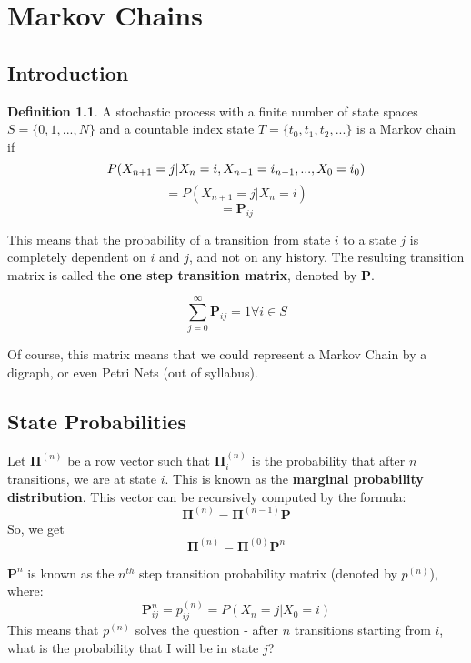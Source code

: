 \documentclass[12pt,letterpaper]{amsbook}
\theoremstyle{definition}
\newtheorem{definition}{Definition}%
\begin{document}
\chapter{Markov Chains}

\section{Introduction}

\begin{definition}
  A stochastic process with a finite number of state spaces $S = \{0,1,...,N\}$ and a countable index state $T = \{t_0,t_1,t_2,...\}$ is a Markov chain if
  \[P(X_{n+1} = j|X_n = i, X_{n-1} = i_{n-1},...,X_0 = i_0) \\ \]
  \[= P(X_{n+1} = j | X_n = i) \]
  \[= \mathbf{P}_{ij}\]
\end{definition}

This means that the probability of a transition from state $i$ to a state $j$ is completely dependent on $i$ and $j$, and not on any history. The resulting transition matrix is called the \textbf{one step transition matrix}, denoted by $\textbf{P}$.

\begin{lemma}
  \[\sum_{j = 0}^{\infty} \mathbf{P}_{ij} = 1 \forall i \in S\]
\end{lemma}

Of course, this matrix means that we could represent a Markov Chain by a digraph, or even Petri Nets (out of syllabus). 

\section{State Probabilities}

Let $\mathbf{\Pi}^{(n)}$ be a row vector such that $\mathbf{\Pi}^{(n)}_i$ is the probability that after $n$ transitions, we are at state $i$. This is known as the \textbf{marginal probability distribution}. This vector can be recursively computed by the formula:
\[ \mathbf{\Pi}^{(n)} = \mathbf{\Pi}^{(n-1)} \mathbf{P} \]
So, we get
\[ \mathbf{\Pi}^{(n)} = \mathbf{\Pi}^{(0)} \mathbf{P}^n \]

$\mathbf{P}^n$ is known as the $n^{th}$ step transition probability matrix (denoted by $p^{(n)}$), where:
\[\mathbf{P}^{n}_{ij} = p_{ij}^{(n)} = P(X_n = j|X_0 = i)\]
This means that $p^{(n)}$ solves the question - after $n$ transitions starting from $i$, what is the probability that I will be in state $j$?
\end{document}
